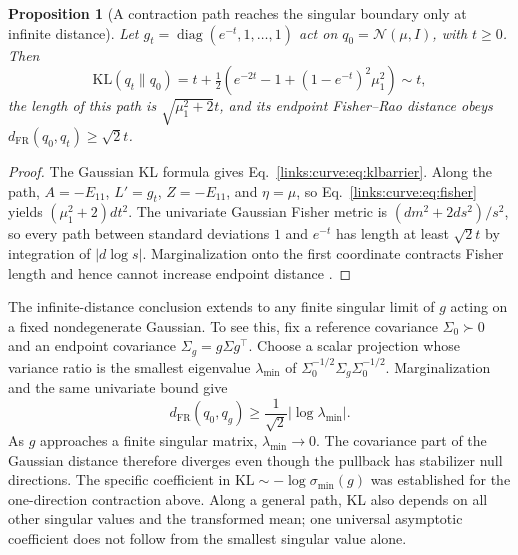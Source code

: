 \documentclass[11pt]{article}
\newtheorem{proposition}[theorem]{Proposition}
\theoremstyle{definition}
\theoremstyle{remark}
\begin{document}
\begin{proposition}[A contraction path reaches the singular boundary only at infinite distance]
\label{links:curve:prop:barrier}
Let $g_t=\operatorname{diag}(e^{-t},1,\ldots,1)$ act on $q_0=\mathcal N(\mu,I)$, with $t\ge0$. Then
\begin{equation}
\mathrm{KL}(q_t\|q_0)
=t+\tfrac12\left(e^{-2t}-1+(1-e^{-t})^2\mu_1^2\right)\sim t,
\label{links:curve:eq:klbarrier}
\end{equation}
the length of this path is $\sqrt{\mu_1^2+2}t$, and its endpoint Fisher--Rao distance obeys $d_{\mathrm{FR}}(q_0,q_t)\ge\sqrt2t$.
\end{proposition}
\begin{proof}
The Gaussian KL formula gives Eq.~\eqref{links:curve:eq:klbarrier}. Along the path, $A=-E_{11}$, $L'=g_t$, $Z=-E_{11}$, and $\eta=\mu$, so Eq.~\eqref{links:curve:eq:fisher} yields $(\mu_1^2+2)dt^2$. The univariate Gaussian Fisher metric is $(dm^2+2ds^2)/s^2$, so every path between standard deviations $1$ and $e^{-t}$ has length at least $\sqrt2t$ by integration of $|d\log s|$. Marginalization onto the first coordinate contracts Fisher length and hence cannot increase endpoint distance \cite{frame:AmariNagaoka2000}.
\end{proof}

The infinite-distance conclusion extends to any finite singular limit of $g$ acting on a fixed nondegenerate Gaussian. To see this, fix a reference covariance $\Sigma_0\succ0$ and an endpoint covariance $\Sigma_g=g\Sigma g^\top$. Choose a scalar projection whose variance ratio is the smallest eigenvalue $\lambda_{\min}$ of $\Sigma_0^{-1/2}\Sigma_g\Sigma_0^{-1/2}$. Marginalization and the same univariate bound give
\begin{equation}
d_{\mathrm{FR}}(q_0,q_g)\ge\frac{1}{\sqrt2}|\log\lambda_{\min}|.
\label{links:curve:eq:general_boundary}
\end{equation}
As $g$ approaches a finite singular matrix, $\lambda_{\min}\to0$. The covariance part of the Gaussian distance therefore diverges even though the pullback has stabilizer null directions. The specific coefficient in $\mathrm{KL}\sim-\log\sigma_{\min}(g)$ was established for the one-direction contraction above. Along a general path, KL also depends on all other singular values and the transformed mean; one universal asymptotic coefficient does not follow from the smallest singular value alone.
\end{document}
